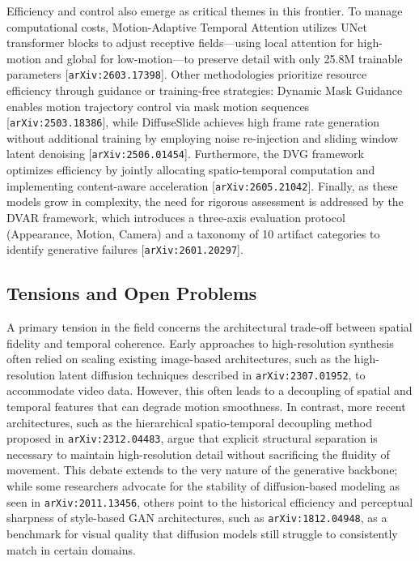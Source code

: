 \documentclass[11pt]{article}
\begin{document}
Efficiency and control also emerge as critical themes in this frontier. To manage computational costs, Motion-Adaptive Temporal Attention utilizes UNet transformer blocks to adjust receptive fields—using local attention for high-motion and global for low-motion—to preserve detail with only 25.8M trainable parameters [\texttt{arXiv:2603.17398}]. Other methodologies prioritize resource efficiency through guidance or training-free strategies: Dynamic Mask Guidance enables motion trajectory control via mask motion sequences [\texttt{arXiv:2503.18386}], while DiffuseSlide achieves high frame rate generation without additional training by employing noise re-injection and sliding window latent denoising [\texttt{arXiv:2506.01454}]. Furthermore, the DVG framework optimizes efficiency by jointly allocating spatio-temporal computation and implementing content-aware acceleration [\texttt{arXiv:2605.21042}]. Finally, as these models grow in complexity, the need for rigorous assessment is addressed by the DVAR framework, which introduces a three-axis evaluation protocol (Appearance, Motion, Camera) and a taxonomy of 10 artifact categories to identify generative failures [\texttt{arXiv:2601.20297}].

\subsection{Tensions and Open Problems}

A primary tension in the field concerns the architectural trade-off between spatial fidelity and temporal coherence. Early approaches to high-resolution synthesis often relied on scaling existing image-based architectures, such as the high-resolution latent diffusion techniques described in \texttt{arXiv:2307.01952}, to accommodate video data. However, this often leads to a decoupling of spatial and temporal features that can degrade motion smoothness. In contrast, more recent architectures, such as the hierarchical spatio-temporal decoupling method proposed in \texttt{arXiv:2312.04483}, argue that explicit structural separation is necessary to maintain high-resolution detail without sacrificing the fluidity of movement. This debate extends to the very nature of the generative backbone; while some researchers advocate for the stability of diffusion-based modeling as seen in \texttt{arXiv:2011.13456}, others point to the historical efficiency and perceptual sharpness of style-based GAN architectures, such as \texttt{arXiv:1812.04948}, as a benchmark for visual quality that diffusion models still struggle to consistently match in certain domains.
\end{document}
